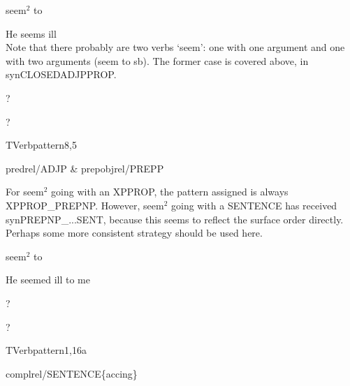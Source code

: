 
\begin{thetadescr}
\evitem  seem$^{2}$ to
\esitem
     \begin{examples}
        \example He seems ill\\
                 Note that there probably are two verbs `seem': one with one 
                 argument
                 and one with two arguments (seem to sb). The former case is 
                 covered above, in synCLOSEDADJPPROP.
     \end{examples}
\end{thetadescr}



\begin{thetadescr}
\evitem ? 
\esitem
     \begin{examples}
        \example ?
     \end{examples}
\end{thetadescr}


\newpage
{}
\begin{vpattern}
 TVerbpattern8,5
\csritem \mbox{}\\
     \begin{csr}
      predrel/ADJP & prepobjrel/PREPP
     \end{csr}
\remarksitem For seem$^{2}$ going with an XPPROP, the pattern assigned is 
always XPPROP\_PREPNP. However, seem$^{2}$ going with a SENTENCE has received 
synPREPNP\_...SENT, because this seems to reflect the surface order directly.
Perhaps some more consistent strategy should be used here.
\end{vpattern}


\begin{thetadescr}
\evitem  seem$^{2}$ to
\esitem
     \begin{examples}
        \example He seemed ill to me
     \end{examples}
\end{thetadescr}



\begin{thetadescr}
\evitem  ?
\esitem
     \begin{examples}
        \example ?
     \end{examples}
\end{thetadescr}


\newpage
\verbpattern{[synCLOSEDGERUND] }
\begin{vpattern}
 TVerbpattern1,16a
\csritem \mbox{}\\
     \begin{csr}
      complrel/SENTENCE\{accing\}
     \end{csr}
\remarksitem
\end{vpattern}

